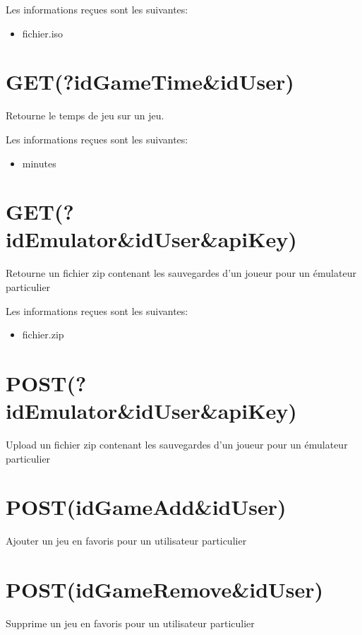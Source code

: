 \documentclass[a4paper,12pt,french]{sphinxmanual}
\begin{document}
\sphinxAtStartPar
Les informations reçues sont les suivantes:
\begin{itemize}
\item {} 
\sphinxAtStartPar
fichier.iso

\end{itemize}


\section{GET(?idGameTime\&idUser)}
\label{\detokenize{fonctionnelleAPI:get-idgametime-iduser}}
\sphinxAtStartPar
Retourne le temps de jeu sur un jeu.

\sphinxAtStartPar
Les informations reçues sont les suivantes:
\begin{itemize}
\item {} 
\sphinxAtStartPar
minutes

\end{itemize}


\section{GET(?idEmulator\&idUser\&apiKey)}
\label{\detokenize{fonctionnelleAPI:get-idemulator-iduser-apikey}}
\sphinxAtStartPar
Retourne un fichier zip contenant les sauvegardes d’un joueur pour un émulateur particulier

\sphinxAtStartPar
Les informations reçues sont les suivantes:
\begin{itemize}
\item {} 
\sphinxAtStartPar
fichier.zip

\end{itemize}


\section{POST(?idEmulator\&idUser\&apiKey)}
\label{\detokenize{fonctionnelleAPI:post-idemulator-iduser-apikey}}
\sphinxAtStartPar
Upload un fichier zip contenant les sauvegardes d’un joueur pour un émulateur particulier


\section{POST(idGameAdd\&idUser)}
\label{\detokenize{fonctionnelleAPI:post-idgameadd-iduser}}
\sphinxAtStartPar
Ajouter un jeu en favoris pour un utilisateur particulier


\section{POST(idGameRemove\&idUser)}
\label{\detokenize{fonctionnelleAPI:post-idgameremove-iduser}}
\sphinxAtStartPar
Supprime un jeu en favoris pour un utilisateur particulier
\end{document}
